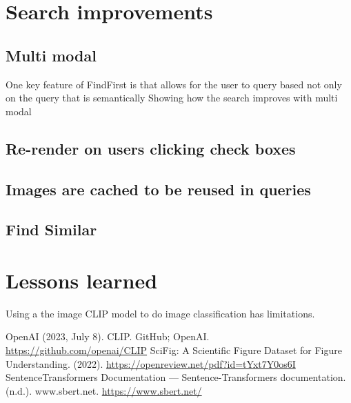 \documentclass[letterpaper, 10 pt, conference]{ieeeconf}  %
\begin{document}
\section{Search improvements}
\subsection{Multi modal}
One key feature of FindFirst is that allows for the user to query based not only on the 
query that is semantically 
Showing how the search improves with multi modal 
\subsection{Re-render on users clicking check boxes}
\subsection{Images are cached to be reused in queries}

\subsection{Find Similar}

\section{Lessons learned} 
Using a the image CLIP model to do image classification has limitations. 


\begin{thebibliography}{99}
 OpenAI (2023, July 8). CLIP. GitHub; OpenAI. \url{https://github.com/openai/CLIP}
 SciFig: A Scientific Figure Dataset for Figure Understanding. (2022). \url{https://openreview.net/pdf?id=tYxt7Y0os6I}
 SentenceTransformers Documentation — Sentence-Transformers documentation. (n.d.). www.sbert.net. \url{https://www.sbert.net/}
\end{thebibliography}
\end{document}

